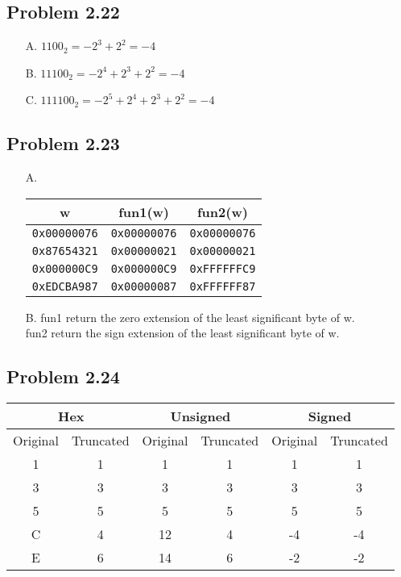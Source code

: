 \documentclass[a4paper]{article}
\begin{document}
\subsection*{Problem 2.22}
\begin{enumerate}
    \item [A.] $1100_2=-2^3+2^2=-4$
    \item [B.] $11100_2=-2^4+2^3+2^2=-4$
    \item [C.] $111100_2=-2^5+2^4+2^3+2^2=-4$
\end{enumerate}

\subsection*{Problem 2.23}
\begin{enumerate}
    \item [A.]\begin{tabular}{c|c|c}
            w&fun1(w)&fun2(w)\\
            \hline
            \tt{0x00000076}&\tt{0x00000076}&\tt{0x00000076}\\
            \tt{0x87654321}&\tt{0x00000021}&\tt{0x00000021}\\
            \tt{0x000000C9}&\tt{0x000000C9}&\tt{0xFFFFFFC9}\\
            \tt{0xEDCBA987}&\tt{0x00000087}&\tt{0xFFFFFF87}\\
          \end{tabular}
    \item [B.] fun1 return the zero extension of the least significant byte of w.\\
               fun2 return the sign extension of the least significant byte of w.
\end{enumerate}

\subsection*{Problem 2.24}
\begin{tabular}{cc|cc|cc}
    \multicolumn{2}{c|}{Hex}&\multicolumn{2}{|c|}{Unsigned}&\multicolumn{2}{|c}{Signed}\\
    \hline
    Original&Truncated&Original&Truncated&Original&Truncated\\
    \hline
    1&1&1&{1}&1&{1}\\
    3&3&3&{3}&3&{3}\\
    5&5&5&{5}&5&{5}\\
    C&4&12&{4}&-4&{-4}\\
    E&6&14&{6}&-2&{-2}
\end{tabular}
\end{document}
